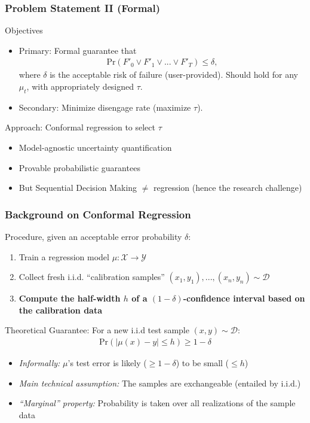 \documentclass[handout]{beamer}
\begin{document}
\begin{frame}
    \frametitle{Problem Statement II (Formal)}
    Objectives
    \begin{itemize}
    \item Primary: Formal guarantee that
    \begin{align}
        \text{Pr}(F'_0 \vee F'_1 \vee ... \vee F'_T) \leq \delta,
    \end{align}
    where $\delta$ is the acceptable risk of failure (user-provided). Should hold for any $\mu_t$, with appropriately designed $\tau$.
    \item Secondary: Minimize disengage rate (maximize $\tau$).
    \end{itemize}

    \pause

    Approach: Conformal regression \cite{lei2018distribution} to select $\tau$
    \begin{itemize}
        \item Model-agnostic uncertainty quantification
        \item Provable probabilistic guarantees
        \item But Sequential Decision Making $\ne$ regression (hence the research challenge)
    \end{itemize}

\end{frame}

\begin{frame}
    \frametitle{Background on Conformal Regression \cite{lei2018distribution}}

    Procedure, given an acceptable error probability $\delta$:
    \begin{enumerate}
    \item Train a regression model $\mu: \mathcal{X} \rightarrow \mathcal{Y}$
    \item Collect fresh i.i.d. ``calibration samples'' $(x_1, y_1), ..., (x_n, y_n) \sim \mathcal{D}$
    \item \textbf{Compute the half-width $h$ of a $(1-\delta)$-confidence interval based on the calibration data}
    \end{enumerate}

    Theoretical Guarantee: For a new i.i.d test sample $(x, y) \sim \mathcal{D}$:
    \begin{align}
    \text{Pr}(|\mu(x) - y| \leq h) \geq 1-\delta
    \end{align}

    \begin{itemize}
    \item \textit{Informally:} $\mu$'s test error is likely ($\geq 1 - \delta$) to be small ($\leq h$)

    \item \textit{Main technical assumption:} The samples are exchangeable (entailed by i.i.d.)

    \item \textit{``Marginal'' property:} Probability is taken over all realizations of the sample data 
   \end{itemize}

\end{frame}
\end{document}
